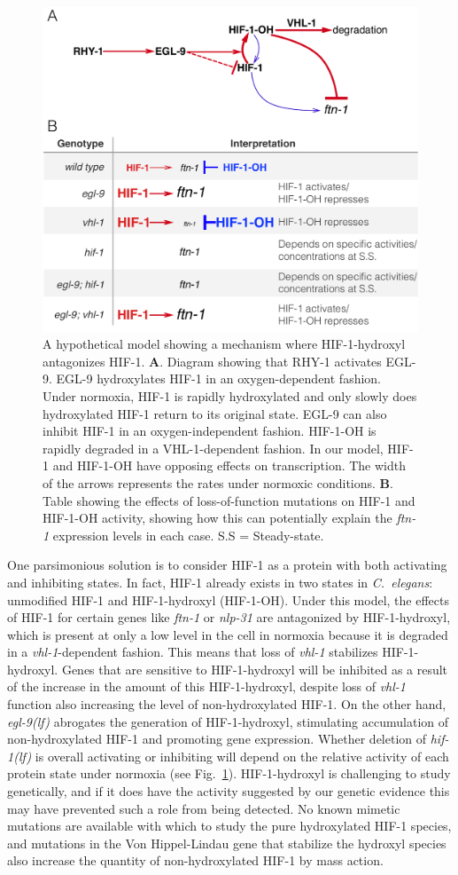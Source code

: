 \documentclass[9pt,twocolumn,twoside]{pnas-new}
\newcommand{\cel}{\emph{C.~elegans}}
\newcommand{\gene}[1]{\mbox{\emph{#1}}}
\newcommand{\nlp}{\gene{nlp-31}}
\newcommand{\ftna}{\gene{ftn-1}}
\newcommand{\egl}{\gene{egl-9(lf)}}
\newcommand{\hif}{\gene{hif-1(lf)}}
\newcommand{\hifp}{HIF-1}
\begin{document}
\begin{figure}[tbhp]
  \centering
  \includegraphics[width=.5\textwidth]{../figs/hif1oh_model.pdf}
  \caption{
    A hypothetical model showing a mechanism where \hifp{}-hydroxyl antagonizes
    \hifp{}. \textbf{A}. Diagram showing that RHY-1 activates EGL-9. EGL-9
    hydroxylates HIF-1 in an oxygen-dependent fashion. Under normoxia, HIF-1 is
    rapidly hydroxylated and only slowly does hydroxylated HIF-1 return to its
    original state. EGL-9 can also inhibit HIF-1 in an oxygen-independent
    fashion. HIF-1-OH is rapidly degraded in a VHL-1-dependent fashion. In
    our model, HIF-1 and HIF-1-OH have opposing effects on transcription.
    The width of the arrows represents the rates under normoxic conditions.
    \textbf{B}. Table showing the effects of loss-of-function mutations on HIF-1
    and HIF-1-OH activity, showing how this can potentially explain the
    \gene{ftn-1} expression levels in each case. S.S = Steady-state.
  }
\label{fig:hif1oh_table}
\end{figure}

One parsimonious solution is to consider \hifp{} as a protein with both
activating and inhibiting states. In fact, \hifp{} already exists in two states
in \cel{}: unmodified \hifp{} and \hifp{}-hydroxyl (\hifp{}-OH). Under this
model, the effects of \hifp{} for certain genes like \ftna{} or \nlp{} are
antagonized by \hifp{}-hydroxyl, which is present at only a low level in the
cell in normoxia because it is degraded in a \gene{vhl-1}-dependent fashion.
This means that loss of \gene{vhl-1} stabilizes \hifp{}-hydroxyl. Genes that are
sensitive to \hifp{}-hydroxyl will be inhibited as a result of the increase in
the amount of this \hifp{}-hydroxyl, despite loss of \gene{vhl-1} function
also increasing the level of non-hydroxylated \hifp{}. On the other hand, \egl{}
abrogates the generation of \hifp{}-hydroxyl, stimulating accumulation of
non-hydroxylated \hifp{} and promoting gene expression. Whether deletion of \hif{}
is overall activating or inhibiting will depend on the relative activity of each
protein state under normoxia (see Fig.~\ref{fig:hif1oh_table}). \hifp{}-hydroxyl
is challenging to study genetically, and if it does have the activity suggested
by our genetic evidence this may have prevented such a role from being detected.
No known mimetic mutations are available with which to study the pure
hydroxylated \hifp{} species, and mutations in the Von Hippel-Lindau gene that
stabilize the hydroxyl species also increase the quantity of non-hydroxylated
\hifp{} by mass action.
\end{document}
